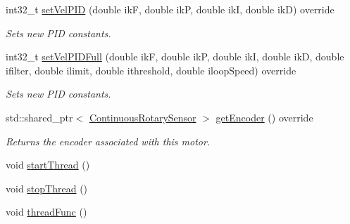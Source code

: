 \begin{DoxyCompactItemize}
int32\+\_\+t \mbox{\hyperlink{classokapi_1_1ThreadedMockMotor_a7552659609cad8e9a2ca2c6eb2e1737b}{set\+Vel\+P\+ID}} (double ikF, double ikP, double ikI, double ikD) override
\begin{DoxyCompactList}\small\item\em Sets new P\+ID constants. \end{DoxyCompactList}\item 
int32\+\_\+t \mbox{\hyperlink{classokapi_1_1ThreadedMockMotor_acfbad54d3a1482bf3bd0444351c28111}{set\+Vel\+P\+I\+D\+Full}} (double ikF, double ikP, double ikI, double ikD, double ifilter, double ilimit, double ithreshold, double iloop\+Speed) override
\begin{DoxyCompactList}\small\item\em Sets new P\+ID constants. \end{DoxyCompactList}\item 
std\+::shared\+\_\+ptr$<$ \mbox{\hyperlink{classokapi_1_1ContinuousRotarySensor}{Continuous\+Rotary\+Sensor}} $>$ \mbox{\hyperlink{classokapi_1_1ThreadedMockMotor_ab070e6847c72ae1aef4e225bbfa65b87}{get\+Encoder}} () override
\begin{DoxyCompactList}\small\item\em Returns the encoder associated with this motor. \end{DoxyCompactList}\item 
void \mbox{\hyperlink{classokapi_1_1ThreadedMockMotor_a270dd8f9dd65003a9167fb6f9207db96}{start\+Thread}} ()
\item 
void \mbox{\hyperlink{classokapi_1_1ThreadedMockMotor_a18f192acedca2cb38b3391d409e74bfd}{stop\+Thread}} ()
\item 
void \mbox{\hyperlink{classokapi_1_1ThreadedMockMotor_a725e1ee6b45843d4af1cd1385b0a938b}{thread\+Func}} ()
\end{DoxyCompactItemize}
